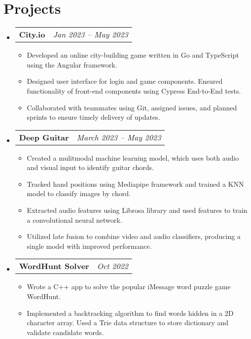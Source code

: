 \documentclass[letterpaper,11pt]{article}
\makeatletter
\newcommand{\resumeItemExperience}[1]{
  \item\small{
    {#1 \vspace{-2pt}}
  }
}
\newcommand{\resumeSubheadingProject}[2]{
  \vspace{-1pt}\item
    \begin{tabular*}{0.97\textwidth}{l@{\extracolsep{\fill}}r}
      \textbf{#1} & \textit{\small #2} \\
    \end{tabular*}\vspace{-5pt}
}
\newcommand{\resumeSubHeadingListStart}{\begin{itemize}[leftmargin=*, label={}]}
\newcommand{\resumeSubHeadingListEnd}{\end{itemize}}
\newcommand{\resumeItemListStart}{\begin{itemize}}
\newcommand{\resumeItemListEnd}{\end{itemize}\vspace{-5pt}}
\makeatother
\begin{document}
\section{Projects}
  \resumeSubHeadingListStart
        \resumeSubheadingProject
          {City.io}{Jan 2023 -- May 2023}
          \resumeItemListStart
            \resumeItemExperience
              {Developed an online city-building game written in Go and TypeScript using the Angular framework.}
            \resumeItemExperience
              {Designed user interface for login and game components. Ensured functionality of front-end components using Cypress End-to-End tests.}
            \resumeItemExperience
              {Collaborated with teammates using Git, assigned issues, and planned sprints to ensure timely delivery of updates.}
          \resumeItemListEnd
        \resumeSubheadingProject
          {Deep Guitar}{March 2023 -- May 2023}
          \resumeItemListStart
            \resumeItemExperience
              {Created a mulitmodal machine learning model, which uses both audio and visual input to identify guitar chords.}
            \resumeItemExperience
              {Tracked hand positions using Mediapipe framework and trained a KNN model to classify images by chord.}
            \resumeItemExperience
              {Extracted audio features using Librosa library and used features to train a convolutional neural network.}
            \resumeItemExperience
              {Utilized late fusion to combine video and audio classifiers, producing a single model with improved performance.}
          \resumeItemListEnd
        \resumeSubheadingProject
          {WordHunt Solver}{Oct 2022}
          \resumeItemListStart
            \resumeItemExperience
              {Wrote a C++ app to solve the popular iMessage word puzzle game WordHunt.}
            \resumeItemExperience
              {Implemented a backtracking algorithm to find words hidden in a 2D character array. Used a Trie data structure to store dictionary and validate candidate words.}
          \resumeItemListEnd
    \resumeSubHeadingListEnd
    
\end{document}
